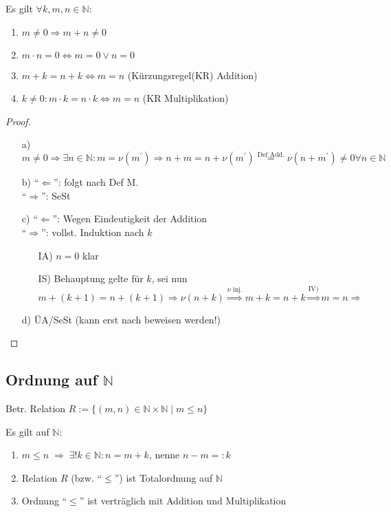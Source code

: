 \begin{conclusion}
	Es gilt $\forall k,m,n\in\mathbb{N}$:
	\begin{enumerate}[label={\alph*)}]
		\item $m\neq 0 \Rightarrow m+n \neq 0$
		\item $m\cdot n = 0 \Leftrightarrow m = 0 \lor n = 0$
		\item $m + k = n + k \Leftrightarrow m = n$ (Kürzungsregel(KR) Addition)
		\item $k\neq 0: m\cdot k = n\cdot k \Leftrightarrow m = n$ (KR Multiplikation)
	\end{enumerate}
\end{conclusion}

\begin{proof}
	\begin{itemize}
		\item[a)] $m \neq 0 \Rightarrow \exists n \in \mathbb{N} \colon m = \nu(m^{'}) \Rightarrow n + m = n + \nu(m^{'}) \overset{\text{Def Add.}}{=} \nu(n+m^{'}) \neq 0 \forall n \in \mathbb{N}$
		\item[b)] ``$\Leftarrow$'': folgt nach Def M. \\ ``$\Rightarrow$'': SeSt
		\item[c)] ``$\Leftarrow$'': Wegen Eindeutigkeit der Addition\\
		``$\Rightarrow$'': vollst. Induktion nach $k$
			\begin{itemize}
				\item[IA)] $n = 0$ klar
				\item[IS)] Behauptung gelte für $k$, sei nun $m+(k+1) = n + (k+1) \Rightarrow \nu(n+k) \overset{\nu \text{ inj.}}{\Rightarrow} m+k = n+k \overset{\text{IV)}}{\Rightarrow} m = n \Rightarrow$
			\end{itemize}
		\item[d)]ÜA/SeSt (kann erst nach  beweisen werden!)
	\end{itemize}
\end{proof}

\subsection{Ordnung auf \texorpdfstring{$\boldsymbol{\mathbb{N}}$}{N}}
\begin{*definition}
	Betr. Relation $R:=\{(m,n) \in\mathbb{N}\times\mathbb{N} \mid m \le n\}$
\end{*definition}
\begin{proposition}
	Es gilt auf $\mathbb{N}$:
	\begin{enumerate}[label={\arabic*)}]
		\item $m\le n \;\Rightarrow \;\exists!k\in\mathbb{N}: n = m + k$, nenne $n - m=:k$ 
		\item Relation $R$ (bzw. "`$\le$"') ist Totalordnung auf $\mathbb{N}$
		\item Ordnung "`$\leq$"' ist verträglich mit Addition und Multiplikation
	\end{enumerate}
\end{proposition}

